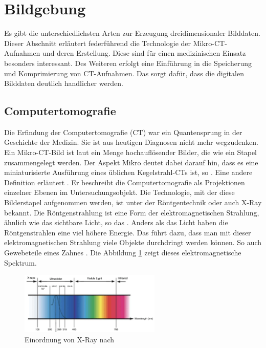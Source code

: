 \section{Bildgebung}
\label{sec:technologisch} Es gibt die unterschiedlichsten Arten zur Erzeugung
dreidimensionaler Bilddaten. Dieser Abschnitt erläutert federführend die Technologie
der Mikro-\ac{CT}-Aufnahmen und deren Erstellung. Diese sind für einen medizinischen
Einsatz besonders interessant. Des Weiteren erfolgt eine Einführung in die
Speicherung und Komprimierung von \ac{CT}-Aufnahmen. Das sorgt dafür, dass die digitalen
Bilddaten deutlich handlicher werden.

\subsection{Computertomografie}
\label{subsec:computertomografie} Die Erfindung der Computertomografie (\ac{CT})
war ein Quantensprung in der Geschichte der Medizin. Sie ist aus heutigen Diagnosen
nicht mehr wegzudenken. Ein Mikro-\ac{CT}-Bild ist laut \citet[S.~1]{baird2017}
ein Menge hochauflösender Bilder, die wie ein Stapel zusammengelegt werden. Der
Aspekt Mikro deutet dabei darauf hin, dass es eine miniaturisierte Ausführung eines
üblichen Kegelstrahl-\ac{CT}s ist, so \citet[S.~340]{buzug2011}. Eine andere
Definition erläutert \citet[S.~49]{lehmann2013bildverarbeitung}. Er beschreibt
die Computertomografie als Projektionen einzelner Ebenen im Untersuchungsobjekt.
Die Technologie, mit der diese Bilderstapel aufgenommen werden, ist unter der Röntgentechnik
oder auch \ac{X-Ray} bekannt. Die Röntgenstrahlung ist eine Form der elektromagnetischen
Strahlung, ähnlich wie das sichtbare Licht, so das \citet[K.~1]{nib2024}. Anders
als das Licht haben die Röntgenstrahlen eine viel höhere Energie. Das führt dazu,
dass man mit dieser elektromagnetischen Strahlung viele Objekte durchdringt werden
können. So auch Gewebeteile eines Zahnes \citep[vgl.][K.~1]{nib2024}. Die
Abbildung \ref{fig:spectrum} zeigt dieses elektromagnetische Spektrum.

\begin{figure}[h]
	\centering
	\includegraphics[width=0.6\textwidth]{img/x_ray.jpg}
	\caption{Einordnung von X-Ray nach \citet[S.~5]{zwinkels2015}}
	\label{fig:spectrum}
\end{figure}

